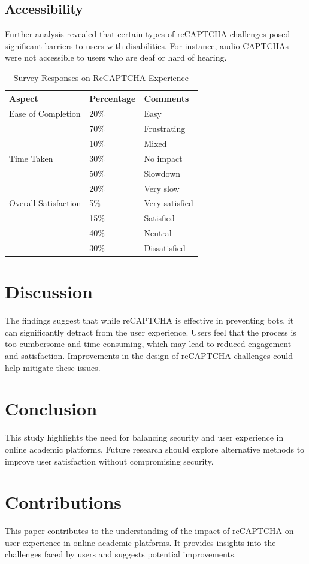 \documentclass{article}
\begin{document}
\subsection{Accessibility}
Further analysis revealed that certain types of reCAPTCHA challenges posed significant barriers to users with disabilities. For instance, audio CAPTCHAs were not accessible to users who are deaf or hard of hearing.

\begin{table}[htbp]
\centering
\caption{Survey Responses on ReCAPTCHA Experience}
\label{tab:survey_results}
\begin{tabular}{@{}lll@{}}
\toprule
\textbf{Aspect} & \textbf{Percentage} & \textbf{Comments} \\ \midrule
Ease of Completion & 20\% & Easy \\
                    & 70\% & Frustrating \\
                    & 10\% & Mixed \\ \midrule
Time Taken & 30\% & No impact \\
           & 50\% & Slowdown \\
           & 20\% & Very slow \\ \midrule
Overall Satisfaction & 5\% & Very satisfied \\
                     & 15\% & Satisfied \\
                     & 40\% & Neutral \\
                     & 30\% & Dissatisfied \\ \bottomrule
\end{tabular}
\end{table}

\section{Discussion}
The findings suggest that while reCAPTCHA is effective in preventing bots, it can significantly detract from the user experience. Users feel that the process is too cumbersome and time-consuming, which may lead to reduced engagement and satisfaction. Improvements in the design of reCAPTCHA challenges could help mitigate these issues.

\section{Conclusion}
This study highlights the need for balancing security and user experience in online academic platforms. Future research should explore alternative methods to improve user satisfaction without compromising security.

\section{Contributions}
This paper contributes to the understanding of the impact of reCAPTCHA on user experience in online academic platforms. It provides insights into the challenges faced by users and suggests potential improvements.
\end{document}
